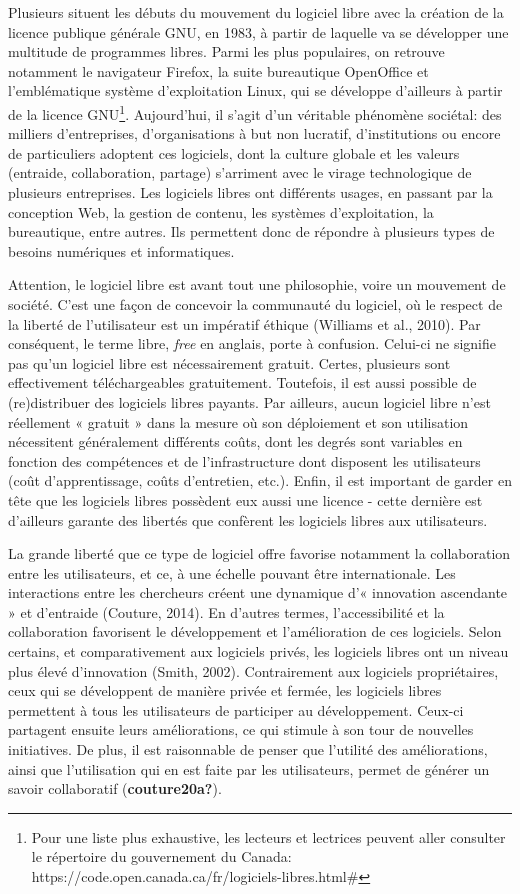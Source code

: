 \documentclass[
  letterpaper,
  DIV=11,
  numbers=noendperiod]{scrreprt}
\begin{document}
Plusieurs situent les débuts du mouvement du logiciel libre avec la
création de la licence publique générale GNU, en 1983, à partir de
laquelle va se développer une multitude de programmes libres. Parmi les
plus populaires, on retrouve notamment le navigateur Firefox, la suite
bureautique OpenOffice et l'emblématique système d'exploitation Linux,
qui se développe d'ailleurs à partir de la licence GNU\footnote{Pour une
  liste plus exhaustive, les lecteurs et lectrices peuvent aller
  consulter le répertoire du gouvernement du Canada:
  https://code.open.canada.ca/fr/logiciels-libres.html\#}. Aujourd'hui,
il s'agit d'un véritable phénomène sociétal: des milliers d'entreprises,
d'organisations à but non lucratif, d'institutions ou encore de
particuliers adoptent ces logiciels, dont la culture globale et les
valeurs (entraide, collaboration, partage) s'arriment avec le virage
technologique de plusieurs entreprises. Les logiciels libres ont
différents usages, en passant par la conception Web, la gestion de
contenu, les systèmes d'exploitation, la bureautique, entre autres. Ils
permettent donc de répondre à plusieurs types de besoins numériques et
informatiques.

Attention, le logiciel libre est avant tout une philosophie, voire un
mouvement de société. C'est une façon de concevoir la communauté du
logiciel, où le respect de la liberté de l'utilisateur est un impératif
éthique (Williams et al., 2010). Par conséquent, le terme libre,
\emph{free} en anglais, porte à confusion. Celui-ci ne signifie pas
qu'un logiciel libre est nécessairement gratuit. Certes, plusieurs sont
effectivement téléchargeables gratuitement. Toutefois, il est aussi
possible de (re)distribuer des logiciels libres payants. Par ailleurs,
aucun logiciel libre n'est réellement « gratuit » dans la mesure où son
déploiement et son utilisation nécessitent généralement différents
coûts, dont les degrés sont variables en fonction des compétences et de
l'infrastructure dont disposent les utilisateurs (coût d'apprentissage,
coûts d'entretien, etc.). Enfin, il est important de garder en tête que
les logiciels libres possèdent eux aussi une licence - cette dernière
est d'ailleurs garante des libertés que confèrent les logiciels libres
aux utilisateurs.

La grande liberté que ce type de logiciel offre favorise notamment la
collaboration entre les utilisateurs, et ce, à une échelle pouvant être
internationale. Les interactions entre les chercheurs créent une
dynamique d'« innovation ascendante » et d'entraide (Couture, 2014). En
d'autres termes, l'accessibilité et la collaboration favorisent le
développement et l'amélioration de ces logiciels. Selon certains, et
comparativement aux logiciels privés, les logiciels libres ont un niveau
plus élevé d'innovation (Smith, 2002). Contrairement aux logiciels
propriétaires, ceux qui se développent de manière privée et fermée, les
logiciels libres permettent à tous les utilisateurs de participer au
développement. Ceux-ci partagent ensuite leurs améliorations, ce qui
stimule à son tour de nouvelles initiatives. De plus, il est raisonnable
de penser que l'utilité des améliorations, ainsi que l'utilisation qui
en est faite par les utilisateurs, permet de générer un savoir
collaboratif (\textbf{couture20a?}).
\end{document}
